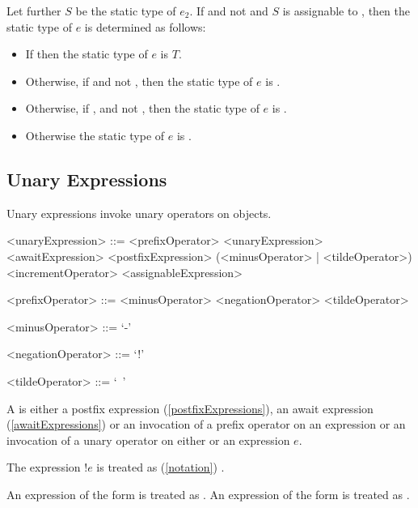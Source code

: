 \documentclass[makeidx]{article}
\begin{document}
{\LMHash{}%
Let further $S$ be the static type of $e_2$.
If  and not 
and $S$ is assignable to ,
then the static type of $e$ is determined as follows:

\begin{itemize}
  \item{} If 
    then the static type of $e$ is $T$.
  \item{} Otherwise, if 
    and not ,
    then the static type of $e$ is .
  \item{} Otherwise, if ,
     and not ,
    then the static type of $e$ is .
  \item{} Otherwise the static type of $e$ is .
\end{itemize}


\subsection{Unary Expressions}

\LMHash{}%
Unary expressions invoke unary operators on objects.

\begin{grammar}
<unaryExpression> ::= <prefixOperator> <unaryExpression>
  \alt <awaitExpression>
  \alt <postfixExpression>
  \alt (<minusOperator> | <tildeOperator>) \SUPER{}
  \alt <incrementOperator> <assignableExpression>

<prefixOperator> ::= <minusOperator>
  \alt <negationOperator>
  \alt <tildeOperator>

<minusOperator> ::= `-'

<negationOperator> ::= `!'

<tildeOperator> ::= `~'
\end{grammar}

\LMHash{}%
A  is either a postfix expression
(\ref{postfixExpressions}),
an await expression (\ref{awaitExpressions})
or an invocation of a prefix operator on an expression
or an invocation of a unary operator on either \SUPER{} or an expression $e$.

\LMHash{}%
The expression $!e$ is treated as
(\ref{notation})
.

\LMHash{}%
An expression of the form  is treated as
.
An expression of the form  is treated as
.

}
\end{document}
